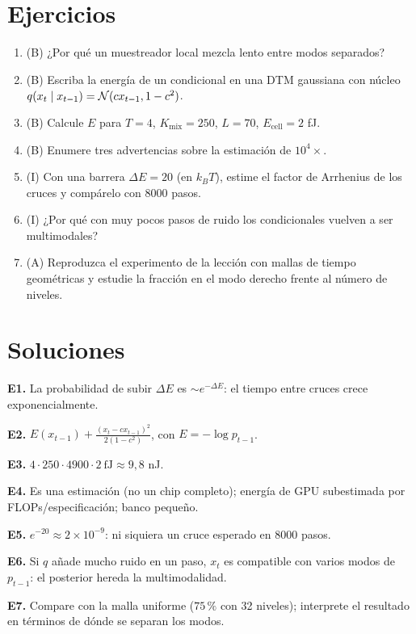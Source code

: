 \documentclass[11pt,a4paper]{article}
\begin{document}
\section{Ejercicios}
\begin{enumerate}[label=\textbf{E\arabic*.}]
\item (B) ¿Por qué un muestreador local mezcla lento entre modos separados?
\item (B) Escriba la energía de un condicional en una DTM gaussiana con núcleo $q(x_t\mid x_{t-1})=\mathcal{N}(cx_{t-1},1-c^2)$.
\item (B) Calcule $E$ para $T=4$, $K_{\text{mix}}=250$, $L=70$, $E_{\text{cell}}=2$ fJ.
\item (B) Enumere tres advertencias sobre la estimación de $10^4\times$.
\item (I) Con una barrera $\Delta E=20$ (en $k_BT$), estime el factor de Arrhenius de los cruces y compárelo con 8000 pasos.
\item (I) ¿Por qué con muy pocos pasos de ruido los condicionales vuelven a ser multimodales?
\item (A) Reproduzca el experimento de la lección con mallas de tiempo geométricas y estudie la fracción en el modo derecho frente al número de niveles.
\end{enumerate}
\section{Soluciones}
\begin{solucion}
\textbf{E1.} La probabilidad de subir $\Delta E$ es $\sim e^{-\Delta E}$: el tiempo entre cruces crece exponencialmente.

\textbf{E2.} $E(x_{t-1})+\frac{(x_t-cx_{t-1})^2}{2(1-c^2)}$, con $E=-\log p_{t-1}$.

\textbf{E3.} $4\cdot250\cdot4900\cdot2\ \text{fJ}\approx9{,}8$ nJ.

\textbf{E4.} Es una estimación (no un chip completo); energía de GPU subestimada por FLOPs/especificación; banco pequeño.

\textbf{E5.} $e^{-20}\approx2\times10^{-9}$: ni siquiera un cruce esperado en 8000 pasos.

\textbf{E6.} Si $q$ añade mucho ruido en un paso, $x_t$ es compatible con varios modos de $p_{t-1}$: el posterior hereda la multimodalidad.

\textbf{E7.} Compare con la malla uniforme ($75\,\%$ con 32 niveles); interprete el resultado en términos de dónde se separan los modos.
\end{solucion}
\end{document}
